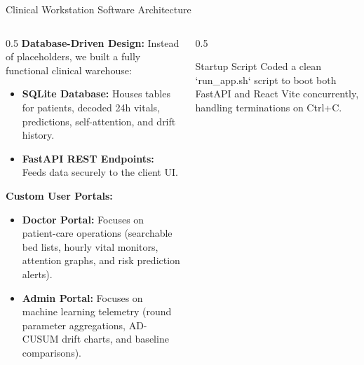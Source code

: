\documentclass[aspectratio=169, 11pt]{beamer}
\begin{document}
\begin{frame}{Clinical Workstation Software Architecture}
    \begin{columns}
        \begin{column}{0.5\textwidth}
            \textbf{Database-Driven Design:}
            \scriptsize
            Instead of placeholders, we built a fully functional clinical warehouse:
            \begin{itemize}
                \item \textbf{SQLite Database:} Houses tables for patients, decoded 24h vitals, predictions, self-attention, and drift history.
                \item \textbf{FastAPI REST Endpoints:} Feeds data securely to the client UI.
            \end{itemize}
            \vspace{0.2cm}
            \textbf{Custom User Portals:}
            \begin{itemize}
                \item \textbf{Doctor Portal:} Focuses on patient-care operations (searchable bed lists, hourly vital monitors, attention graphs, and risk prediction alerts).
                \item \textbf{Admin Portal:} Focuses on machine learning telemetry (round parameter aggregations, AD-CUSUM drift charts, and baseline comparisons).
            \end{itemize}
        \end{column}
        \begin{column}{0.5\textwidth}
            \begin{block}{Startup Script}
                \scriptsize
                Coded a clean `run\_app.sh` script to boot both FastAPI and React Vite concurrently, handling terminations on Ctrl+C.
            \end{block}
            \centering
        \end{column}
    \end{columns}
\end{frame}
\end{document}
